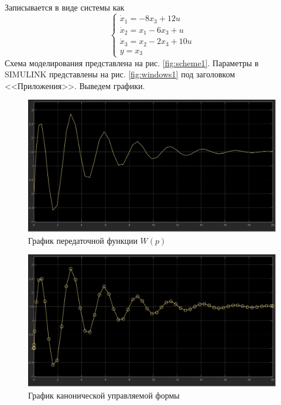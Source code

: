 \documentclass[a4paper, 12pt]{article}
\begin{document}
    Записывается в виде системы как
    $$
    \begin{cases}
        \dot{x}_1=-8x_3+12u\\
        \dot{x}_2=x_1-6x_3+u\\
        \dot{x}_3=x_2-2x_3+10u\\
        y=x_3
    \end{cases}
    $$
    Схема моделирования представлена на рис. \ref{fig:scheme1}.
    Параметры в SIMULINK представлены на рис. \ref{fig:windows1} под заголовком <<Приложения>>. Выведем графики.
    \begin{figure}[H]
        \centering
        \includegraphics[scale=0.3]{W_p_1.jpg}
        \captionsetup{skip=0pt}
        \caption{График передаточной функции $W(p)$}
        \label{fig:wp1}
    \end{figure}
    \begin{figure}[H]
        \centering
        \includegraphics[scale=0.3]{canonical_controlled_form_1.jpg}
        \captionsetup{skip=0pt}
        \caption{График канонической управляемой формы}
        \label{fig:ccf1}
    \end{figure}
\end{document}
